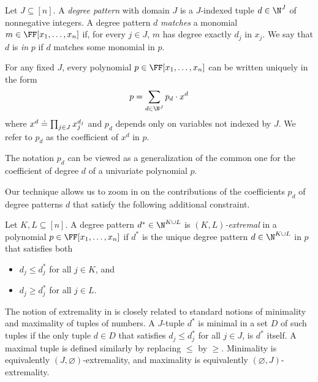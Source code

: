 \documentclass{toc}
\begin{document}
\begin{definition}\label{def.degree-pattern}
  Let \(J \subseteq [n]\).
  A \emph{degree pattern} with domain \(J\) is a \(J\)-indexed
  tuple \(d \in \N^J\) of nonnegative integers.
  A degree pattern \(d\) \emph{matches} a monomial
  $m \in \FF[x_1,\dots,x_n]$
  if,
  for every \(j \in J\),
  \(m\) has degree exactly $d_j$ in $x_j$.
  We say that \(d\) is \emph{in} \(p\) if \(d\) matches some monomial in \(p\).

  For any fixed \(J\),
  every polynomial \(p \in \FF[x_1,\ldots,x_n]\) can be written uniquely in
  the form
  \begin{equation*}
    p = \sum_{d \in \N^J}  p_d \cdot x^d
  \end{equation*}
  where \(x^{\smash{d}} \doteq \prod_{j\in J} x_j^{\smash{d_j}}\)
  and \(p_d\) depends only on variables not indexed by \(J\).
  We refer to \(p_d\) as the coefficient of \(x^d\) in \(p\).
\end{definition}

The notation $p_d$ can be viewed as a generalization of the common one for the
coefficient of degree $d$ of a univariate polynomial $p$.

Our technique allows us to zoom in on the contributions of the coefficients
$p_d$ of degree patterns $d$ that satisfy the
following additional constraint.
\begin{definition}\label{def.extremal}
  Let \(K, L \subseteq [n]\).
  A degree pattern $d^* \in \N^{K \cup L}$ is \emph{$(K,L)$-extremal} in
  a polynomial $p \in \FF[x_1,\dots,x_n]$
  if $d^*$ is the unique degree pattern $d \in \N^{K \cup L}$ in $p$ that satisfies both
  \begin{itemize}
    \item[(i)] $d_j \le d^*_j$ for all $j \in K$, and
    \item[(ii)] $d_j \ge d^*_j$ for all $j \in L$.
  \end{itemize}
\end{definition}
The notion of extremality in  is closely related to
standard notions of minimality and maximality of tuples of numbers.
A \(J\)-tuple $d^*$  is minimal in a set $D$ of such tuples
if the only tuple $d \in D$
that satisfies $d_j \le d^*_j$ for all $j \in J$,
is $d^*$ itself.
A maximal tuple is defined similarly by replacing $\le$ by $\ge$.
Minimality is equivalently \((J,\varnothing)\)-extremality,
and maximality is equivalently \((\varnothing,J)\)-extremality.
\end{document}

